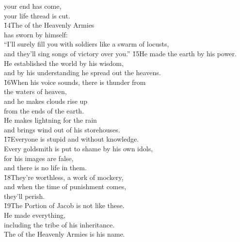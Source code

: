\begin{poetry}
\poeml your end has come, \\
\poemll    your life thread is cut. \\
\poeml \v{14}The  of the Heavenly Armies \\
\poemll    has sworn by himself: \\
\poeml ``I'll surely fill you with soldiers like a swarm of locusts, \\
\poemll    and they'll sing songs of victory over you.''
\poeml \v{15}He made the earth by his power. \\
\poemll    He established the world by his wisdom, \\
\poemlll       and by his understanding he spread out the heavens. \\
\poeml \v{16}When his voice sounds, there is thunder from \\
\poemll    the waters of heaven, \\
\poeml and he makes clouds rise up \\
\poemll    from the ends of the earth. \\
\poeml He makes lightning for the rain \\
\poemll    and brings wind out of his storehouses. \\
\poeml \v{17}Everyone is stupid and without knowledge. \\
\poemll    Every goldsmith is put to shame by his own idols, \\
\poeml for his images are false, \\
\poemll    and there is no life in them. \\
\poeml \v{18}They're worthless, a work of mockery, \\
\poemll    and when the time of punishment comes, \\
\poemlll       they'll perish. \\
\poeml \v{19}The Portion of Jacob is not like these. \\
\poemll    He made everything, \\
\poeml including the tribe of his inheritance. \\
\poemll    The  of the Heavenly Armies is his name.

\end{poetry}
